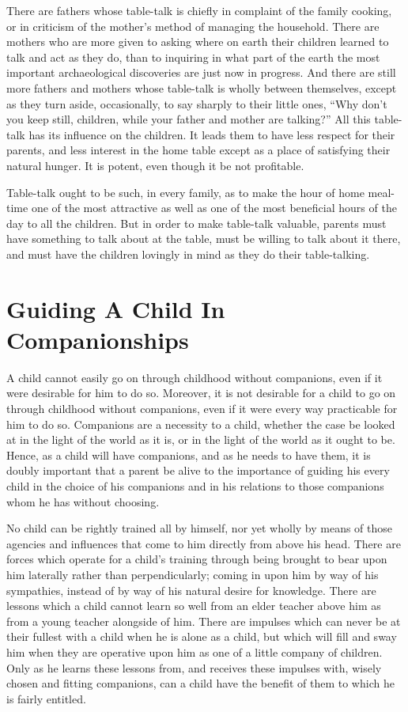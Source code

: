\documentclass[
]{book}
\begin{document}
There are fathers whose table-talk is chiefly in complaint of the family cooking, or in criticism of the mother's method of managing the household. There are mothers who are more given to asking where on earth their children learned to talk and act as they do, than to inquiring in what part of the earth the most important archaeological discoveries are just now in progress. And there are still more fathers and mothers whose table-talk is wholly between themselves, except as they turn aside, occasionally, to say sharply to their little ones, ``Why don't you keep still, children, while your father and mother are talking?'' All this table-talk has its influence on the children. It leads them to have less respect for their parents, and less interest in the home table except as a place of satisfying their natural hunger. It is potent, even though it be not profitable.

Table-talk ought to be such, in every family, as to make the hour of home meal-time one of the most attractive as well as one of the most beneficial hours of the day to all the children. But in order to make table-talk valuable, parents must have something to talk about at the table, must be willing to talk about it there, and must have the children lovingly in mind as they do their table-talking.

\hypertarget{guiding-a-child-in-companionships}{%
\chapter{Guiding A Child In Companionships}\label{guiding-a-child-in-companionships}}

A child cannot easily go on through childhood without companions, even if it were desirable for him to do so. Moreover, it is not desirable for a child to go on through childhood without companions, even if it were every way practicable for him to do so. Companions are a necessity to a child, whether the case be looked at in the light of the world as it is, or in the light of the world as it ought to be. Hence, as a child will have companions, and as he needs to have them, it is doubly important that a parent be alive to the importance of guiding his every child in the choice of his companions and in his relations to those companions whom he has without choosing.

No child can be rightly trained all by himself, nor yet wholly by means of those agencies and influences that come to him directly from above his head. There are forces which operate for a child's training through being brought to bear upon him laterally rather than perpendicularly; coming in upon him by way of his sympathies, instead of by way of his natural desire for knowledge. There are lessons which a child cannot learn so well from an elder teacher above him as from a young teacher alongside of him. There are impulses which can never be at their fullest with a child when he is alone as a child, but which will fill and sway him when they are operative upon him as one of a little company of children. Only as he learns these lessons from, and receives these impulses with, wisely chosen and fitting companions, can a child have the benefit of them to which he is fairly entitled.
\end{document}
